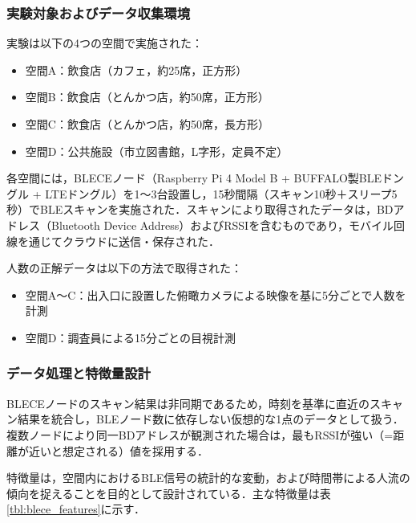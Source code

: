 \subsubsection*{実験対象およびデータ収集環境}

実験は以下の4つの空間で実施された：

\begin{itemize}
  \item 空間A：飲食店（カフェ，約25席，正方形）
  \item 空間B：飲食店（とんかつ店，約50席，正方形）
  \item 空間C：飲食店（とんかつ店，約50席，長方形）
  \item 空間D：公共施設（市立図書館，L字形，定員不定）
\end{itemize}

各空間には，BLECEノード（Raspberry Pi 4 Model B + BUFFALO製BLEドングル + LTEドングル）を1〜3台設置し，15秒間隔（スキャン10秒＋スリープ5秒）でBLEスキャンを実施された．スキャンにより取得されたデータは，BDアドレス（Bluetooth Device Address）およびRSSIを含むものであり，モバイル回線を通じてクラウドに送信・保存された．

人数の正解データは以下の方法で取得された：

\begin{itemize}
  \item 空間A〜C：出入口に設置した俯瞰カメラによる映像を基に5分ごとで人数を計測
  \item 空間D：調査員による15分ごとの目視計測
\end{itemize}

\subsubsection*{データ処理と特徴量設計}

BLECEノードのスキャン結果は非同期であるため，時刻を基準に直近のスキャン結果を統合し，BLEノード数に依存しない仮想的な1点のデータとして扱う．複数ノードにより同一BDアドレスが観測された場合は，最もRSSIが強い（=距離が近いと想定される）値を採用する．

特徴量は，空間内におけるBLE信号の統計的な変動，および時間帯による人流の傾向を捉えることを目的として設計されている．主な特徴量は表\ref{tbl:blece_features}に示す．

